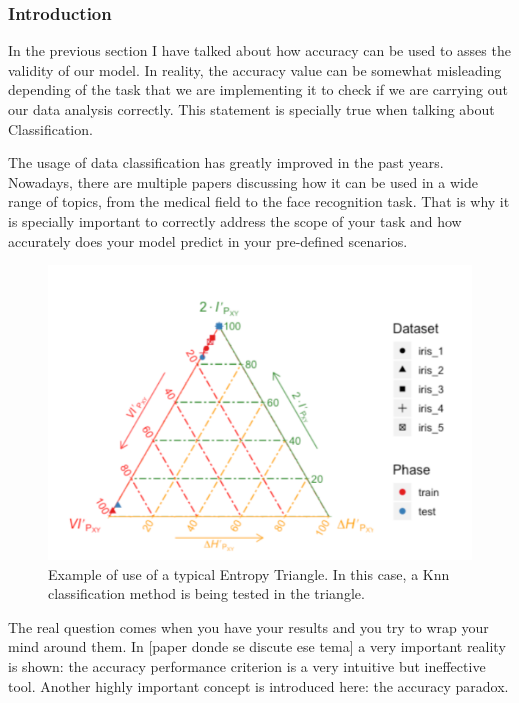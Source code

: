 \documentclass[12pt]{report}
\begin{document}
\subsubsection{Introduction}

In the previous section I have talked about how accuracy can be used to asses the validity of our model. In reality, the accuracy value can be somewhat misleading depending of the task that we are implementing it to check if we are carrying out our data analysis correctly. This statement is specially true when talking about Classification.\par

The usage of data classification has greatly improved in the past years. Nowadays, there are multiple papers discussing how it can be used in a wide range of topics, from the medical field to the face recognition task. That is why it is specially important to correctly address the scope of your task and how accurately does your model predict in your pre-defined scenarios.\par

\begin{figure}[H]
 \centering
  \includegraphics[width=15cm]{Figuras_tfg/Example_ET}
  \caption{Example of use of a typical Entropy Triangle. In this case, a Knn classification method is being tested in the triangle.}
 \label{fig:figure_example_et}
\end{figure} 

The real question comes when you have your results and you try to wrap your mind around them. In [paper donde se discute ese tema] a very important reality is shown: the accuracy performance criterion is a very intuitive but ineffective tool. Another highly important concept is introduced here: the accuracy paradox.\par  
\end{document}
